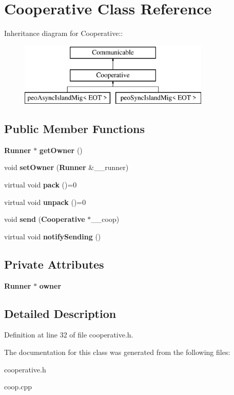 \section{Cooperative Class Reference}
\label{class_cooperative}
Inheritance diagram for Cooperative::\begin{figure}[H]
\begin{center}
\leavevmode
\includegraphics[height=3cm]{class_cooperative}
\end{center}
\end{figure}
\subsection*{Public Member Functions}
\begin{CompactItemize}
\item 
{\bf Runner} $\ast$ {\bf get\-Owner} ()\label{class_cooperative_4012b4e8329e87d26ee266491e1a883e}

\item 
void {\bf set\-Owner} ({\bf Runner} \&\_\-\_\-runner)\label{class_cooperative_fe7b022567174c8305bc78d8c5749b12}

\item 
virtual void {\bf pack} ()=0\label{class_cooperative_6a4848c94031289df281a571ea427d46}

\item 
virtual void {\bf unpack} ()=0\label{class_cooperative_7c31a68fb29e0a9cbe1da8019e4cdafa}

\item 
void {\bf send} ({\bf Cooperative} $\ast$\_\-\_\-coop)\label{class_cooperative_c609f2a1200da7d1ac96005602515fc6}

\item 
virtual void {\bf notify\-Sending} ()\label{class_cooperative_4439ddeaa1246a2e44c003bfb781739b}

\end{CompactItemize}
\subsection*{Private Attributes}
\begin{CompactItemize}
\item 
{\bf Runner} $\ast$ {\bf owner}\label{class_cooperative_7604f094479d08154ede4996a45bf79e}

\end{CompactItemize}


\subsection{Detailed Description}




Definition at line 32 of file cooperative.h.

The documentation for this class was generated from the following files:\begin{CompactItemize}
\item 
cooperative.h\item 
coop.cpp\end{CompactItemize}
